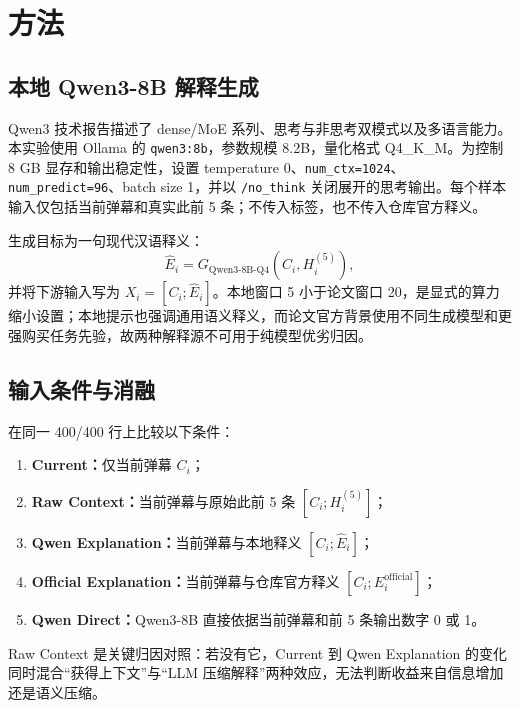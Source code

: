 \documentclass[UTF8,zihao=-4,a4paper]{ctexart}
\begin{document}
\FloatBarrier

\section{方法}

\subsection{本地 Qwen3-8B 解释生成}

Qwen3 技术报告描述了 dense/MoE 系列、思考与非思考双模式以及多语言能力\cite{yang2025qwen3}。本实验使用 Ollama 的 \texttt{qwen3:8b}，参数规模 8.2B，量化格式 Q4\_K\_M。为控制 8 GB 显存和输出稳定性，设置 temperature 0、\texttt{num\_ctx=1024}、\texttt{num\_predict=96}、batch size 1，并以 \texttt{/no\_think} 关闭展开的思考输出。每个样本输入仅包括当前弹幕和真实此前 5 条；不传入标签，也不传入仓库官方释义。

生成目标为一句现代汉语释义：
\begin{equation}
  \widehat E_i = G_{\text{Qwen3-8B-Q4}}(C_i,H_i^{(5)}),
\end{equation}
并将下游输入写为 $X_i=[C_i;\widehat E_i]$。本地窗口 5 小于论文窗口 20，是显式的算力缩小设置；本地提示也强调通用语义释义，而论文官方背景使用不同生成模型和更强购买任务先验，故两种解释源不可用于纯模型优劣归因。

\subsection{输入条件与消融}

在同一 400/400 行上比较以下条件：

\begin{enumerate}[leftmargin=2em]
  \item \textbf{Current：}仅当前弹幕 $C_i$；
  \item \textbf{Raw Context：}当前弹幕与原始此前 5 条 $[C_i;H_i^{(5)}]$；
  \item \textbf{Qwen Explanation：}当前弹幕与本地释义 $[C_i;\widehat E_i]$；
  \item \textbf{Official Explanation：}当前弹幕与仓库官方释义 $[C_i;E_i^{\mathrm{official}}]$；
  \item \textbf{Qwen Direct：}Qwen3-8B 直接依据当前弹幕和前 5 条输出数字 0 或 1。
\end{enumerate}

Raw Context 是关键归因对照：若没有它，Current 到 Qwen Explanation 的变化同时混合“获得上下文”与“LLM 压缩解释”两种效应，无法判断收益来自信息增加还是语义压缩。
\end{document}
